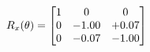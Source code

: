 \documentclass[preview]{standalone}
\begin{document}
\begin{align*}
\special{dvisvgm:raw <g id='unique000'>}R_{x}(\theta) = \begin{bmatrix}1 & 0 & 0 \\0 & -1.00 & +0.07 \\0 & -0.07 & -1.00\end{bmatrix}\special{dvisvgm:raw </g>}
\end{align*}
\end{document}
